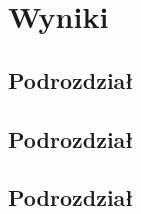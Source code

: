 \chapter{Wyniki} \label{chap:outcomes}

\section{Podrozdział}

\bt

\section{Podrozdział}

\bt

\section{Podrozdział}

\bt
